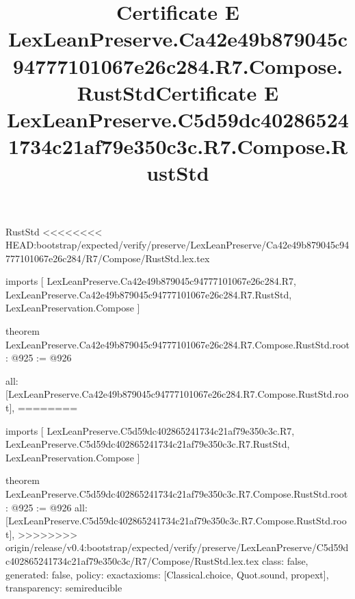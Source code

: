 \begin{lexlean}{RustStd}
<<<<<<<< HEAD:bootstrap/expected/verify/preserve/LexLeanPreserve/Ca42e49b879045c94777101067e26c284/R7/Compose/RustStd.lex.tex
\title{Certificate E LexLeanPreserve.Ca42e49b879045c94777101067e26c284.R7.Compose.RustStd}
\begin{coremodule}
imports [
  LexLeanPreserve.Ca42e49b879045c94777101067e26c284.R7,
  LexLeanPreserve.Ca42e49b879045c94777101067e26c284.R7.RustStd,
  LexLeanPreservation.Compose
]

theorem LexLeanPreserve.Ca42e49b879045c94777101067e26c284.R7.Compose.RustStd.root : @925 := @926 {
  all: [LexLeanPreserve.Ca42e49b879045c94777101067e26c284.R7.Compose.RustStd.root],
========
\title{Certificate E LexLeanPreserve.C5d59dc402865241734c21af79e350c3c.R7.Compose.RustStd}
\begin{coremodule}
imports [
  LexLeanPreserve.C5d59dc402865241734c21af79e350c3c.R7,
  LexLeanPreserve.C5d59dc402865241734c21af79e350c3c.R7.RustStd,
  LexLeanPreservation.Compose
]

theorem LexLeanPreserve.C5d59dc402865241734c21af79e350c3c.R7.Compose.RustStd.root : @925 := @926 {
  all: [LexLeanPreserve.C5d59dc402865241734c21af79e350c3c.R7.Compose.RustStd.root],
>>>>>>>> origin/release/v0.4:bootstrap/expected/verify/preserve/LexLeanPreserve/C5d59dc402865241734c21af79e350c3c/R7/Compose/RustStd.lex.tex
  class: false,
  generated: false,
  policy: exact{axioms: [Classical.choice, Quot.sound, propext]},
  transparency: semireducible
}


\end{coremodule}}
\end{coremodule}
\end{lexlean}
